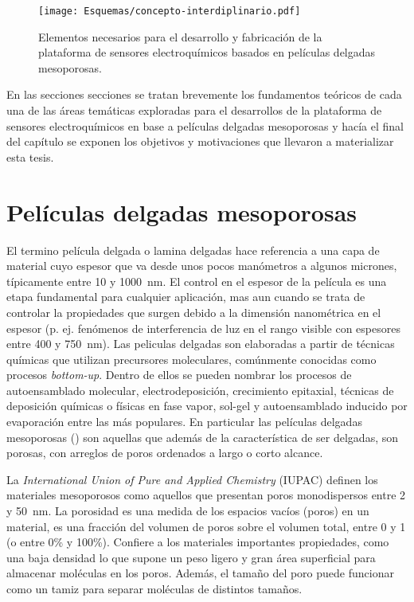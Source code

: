 	       \begin{figure}[ht!]
 				\begin{center}
 				\texttt{[image: Esquemas/concepto-interdiplinario.pdf]}
 				\caption[Plataforma de sensores. Diagrama de Venn.]{Elementos necesarios para el desarrollo y fabricación de la plataforma de sensores electroquímicos basados en películas delgadas mesoporosas.}
 		   		\label{fig:sensores}
 		    	\end{center}
 		    	\end{figure}
 	
 	En las secciones secciones se tratan brevemente los fundamentos teóricos de cada una de las áreas temáticas exploradas para el desarrollos de la plataforma de sensores electroquímicos en base a películas delgadas mesoporosas y hacía el final del capítulo se exponen los objetivos y motivaciones que llevaron a materializar esta tesis.

\section{Películas delgadas mesoporosas}\label{sec:mesoporosos}
	
	El termino película delgada o lamina delgadas hace referencia a una capa de material cuyo espesor que va desde unos pocos manómetros a algunos micrones, típicamente entre 10 y \SI{1000}{\nm}. El control en el espesor de la película es una etapa fundamental para cualquier aplicación, mas aun cuando se trata de controlar la propiedades que surgen debido a la dimensión nanométrica en el espesor (p. ej. fenómenos de interferencia de luz en el rango visible con espesores entre 400 y \SI{750}{\nm}). 
    Las peliculas delgadas son elaboradas a partir de técnicas químicas que utilizan precursores moleculares, comúnmente conocidas como procesos \textit{bottom-up}. Dentro de ellos se pueden nombrar los procesos de autoensamblado molecular, electrodeposición, crecimiento epitaxial, técnicas de deposición químicas o físicas en fase vapor, sol-gel y autoensamblado inducido por evaporación entre las más populares. En particular las películas delgadas mesoporosas (\pdm) son aquellas que además de la característica de ser delgadas, son porosas, con arreglos de poros ordenados a largo o corto alcance.

	La \textit{International Union of Pure and Applied Chemistry} (IUPAC) definen los materiales mesoporosos como aquellos que presentan poros monodispersos entre 2 y \SI{50}{\nm}. La porosidad es una medida de los espacios vacíos (poros) en un material, es una fracción del volumen de poros sobre el volumen total, entre 0 y 1 (o entre 0\% y 100\%).\cite{iupac-1994} Confiere a los materiales importantes propiedades, como una baja densidad lo que supone un peso ligero y gran área superficial para almacenar moléculas en los poros. Además, el tamaño del poro puede funcionar como un tamiz para separar moléculas de distintos tamaños.\cite{Martin2004} 

